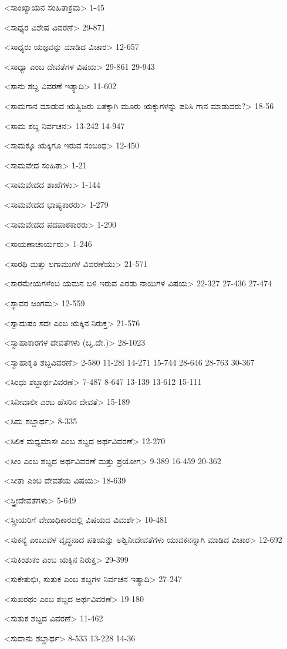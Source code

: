 <ಸಾಂಖ್ಯಾಯನ ಸಂಹಿತಾಕ್ರಮ>
1-45

<ಸಾಧ್ಯರ ವಿಶೇಷ ವಿವರಣೆ>
29-871

<ಸಾಧ್ಯರು ಯಜ್ಞವನ್ನು ಮಾಡಿದ ವಿಚಾರ>
12-657

<ಸಾಧ್ಯಾ ಎಂಬ ದೇವತೆಗಳ ವಿಷಯ>
29-861
29-943

<ಸಾನು ಶಬ್ದ ವಿವರಣೆ ಇತ್ಯಾದಿ>
11-602


<ಸಾಮಗಾನ ಮಾಡುವ ಋತ್ವಿಜರು ಏತಕ್ಕಾಗಿ ಮೂರು ಋಕ್ಕುಗಳನ್ನು ಪಠಿಸಿ ಗಾನ ಮಾಡುವರು?>
18-56

<ಸಾಮ ಶಬ್ದ ನಿರ್ವಚನ>
13-242
14-947

<ಸಾಮಕ್ಕೂ ಋಕ್ಕಿಗೂ ಇರುವ ಸಂಬಂಧ>
12-450

<ಸಾಮವೇದ ಸಂಹಿತಾ>
1-21

<ಸಾಮವೇದದ ಶಾಖೆಗಳು>
1-144

<ಸಾಮವೇದದ ಭಾಷ್ಯಕಾರರು>
1-279

<ಸಾಮವೇದದ ಪದಪಾಠಕಾರರು>
1-290

<ಸಾಯಣಾಚಾರ್ಯರು>
1-246

<ಸಾರಥಿ ಮತ್ತು ಲಗಾಮುಗಳ ವಿವರಣೆಯು>
21-571

<ಸಾರಮೇಯಗಳೆಂಬ ಯಮನ ಬಳಿ ಇರುವ ಎರಡು ನಾಯಿಗಳ ವಿಷಯ>
22-327 
27-436
27-474

<ಸ್ಥಾವರ ಜಂಗಮ>
12-559

<ಸ್ವಾದುಷಂ ಸದಃ ಎಂಬ ಋಕ್ಕಿನ ನಿರುಕ್ತ>
21-576

<ಸ್ವಾಹಾಕಾರಗಳ ದೇವತೆಗಳು (ಬೃ.ದೇ.)>
28-1023

<ಸ್ವಾಹಾಕೃತಿ ಶಬ್ದವಿವರಣೆ>
2-580
11-28l
14-271
15-744 
28-646
28-763
30-367

<ಸಿಂಧು ಶಬ್ದಾರ್ಥವಿವರಣೆ>
7-487 
8-647
13-139 
13-612
15-111


<ಸಿನೀವಾಲೀ ಎಂಬ ಹೆಸರಿನ ದೇವತೆ>
15-189

<ಸಿಮ ಶಬ್ದಾರ್ಥ>
8-335

<ಸಿಲಿಕ ಮಧ್ಯಮಾಸಃ ಎಂಬ ಶಬ್ದದ ಅರ್ಥವಿವರಣೆ>
12-270

<ಸೀಂ ಎಂಬ ಶಬ್ದದ ಅರ್ಥವಿವರಣೆ ಮತ್ತು ಪ್ರಯೋಗ>
9-389
16-459
20-362

<ಸೀತಾ ಎಂಬ ದೇವತೆಯ ವಿಷಯ>
18-639

<ಸ್ತ್ರೀದೇವತೆಗಳು>
5-649

<ಸ್ತ್ರೀಯರಿಗೆ ವೇದಾಧಿಕಾರದಲ್ಲಿ ವಿಷಯದ ವಿಮರ್ಶೆ>
10-481

<ಸುಕನ್ಯೆ ಎಂಬುವಳ ವೃದ್ಧನಾದ ಪತಿಯನ್ನು ಅಶ್ವಿನೀದೇವತೆಗಳು ಯುವಕನನ್ನಾಗಿ ಮಾಡಿದ ವಿಚಾರ>
12-692

<ಸುಕಿಂಶುಕಂ ಎಂಬ ಋಕ್ಕಿನ ನಿರುಕ್ತ>
29-399

<ಸುಕೇತುಭಿಃ, ಸುತುಕ ಎಂಬ ಶಬ್ದಗಳ ನಿರ್ವಚನ ಇತ್ಯಾದಿ>
27-247

<ಸುಖರಥಂ ಎಂಬ ಶಬ್ದದ ಅರ್ಥವಿವರಣೆ>
19-180

<ಸುತುಕ ಶಬ್ದದ ವಿವರಣೆ>
11-462

<ಸುದಾನು ಶಬ್ದಾರ್ಥ>
8-533 
13-228
14-36

